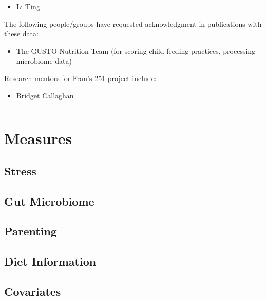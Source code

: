 \documentclass[
]{book}
\providecommand{\tightlist}{%
  \setlength{\itemsep}{0pt}\setlength{\parskip}{0pt}}
\begin{document}
\begin{itemize}
\tightlist
\item
  Li Ting
\end{itemize}

The following people/groups have requested acknowledgment in publications with these data:

\begin{itemize}
\tightlist
\item
  The GUSTO Nutrition Team (for scoring child feeding practices, processing microbiome data)
\end{itemize}

Research mentors for Fran's 251 project include:

\begin{itemize}
\tightlist
\item
  Bridget Callaghan
\end{itemize}

\begin{center}\rule{0.5\linewidth}{0.5pt}\end{center}

\hypertarget{measures}{%
\section{Measures}\label{measures}}

\hypertarget{stress}{%
\subsection{Stress}\label{stress}}

\hypertarget{gut-microbiome}{%
\subsection{Gut Microbiome}\label{gut-microbiome}}

\hypertarget{parenting}{%
\subsection{Parenting}\label{parenting}}

\hypertarget{diet-information}{%
\subsection{Diet Information}\label{diet-information}}

\hypertarget{covariates}{%
\subsection{Covariates}\label{covariates}}
\end{document}
